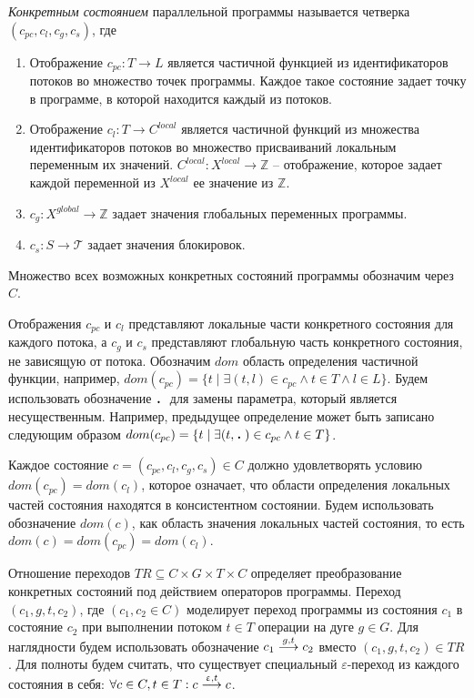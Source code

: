 \emph{Конкретным состоянием} параллельной программы называется четверка $(c_{pc}, c_l, c_g, c_s)$, где
\begin{enumerate}
\item Отображение $c_{pc}: T \to L$ является частичной функцией из идентификаторов потоков во множество точек программы.
Каждое такое состояние задает точку в программе, в которой находится каждый из потоков.
\item Отображение $c_l: T \to C^{local}$ является частичной функций из множества идентификаторов потоков во множество присваиваний локальным переменным их значений. $C^{local}: X^{local} \to \mathbb{Z}$ -- отображение, которое задает каждой переменной из $X^{local}$ ее значение из $\mathbb{Z}$.
\item $c_g: X^{global} \to \mathbb{Z}$ задает значения глобальных переменных программы.
\item $c_s: S \to \mathcal{T}$ задает значения блокировок. 
\end{enumerate}
Множество всех возможных конкретных состояний программы обозначим через $C$.

Отображения $c_{pc}$ и $c_l$ представляют локальные части конкретного состояния для каждого потока, а $c_g$ и $c_s$ представляют глобальную часть конкретного состояния, не зависящую от потока.
Обозначим $dom$ область определения частичной функции, например, $dom(c_{pc})=\{ t \mid \exists (t, l) \in c_{pc} \land t \in T \land l \in L \}$.
Будем использовать обозначение $\qdot$ для замены параметра, который является несущественным.
Например, предыдущее определение может быть записано следующим образом $dom(c_{pc})=\{ t \mid \exists (t, \qdot) \in c_{pc} \land t \in T\}$.

Каждое состояние $c=(c_{pc}, c_l, c_g, c_s)\in C$ должно удовлетворять условию $dom(c_{pc})=dom(c_l)$, которое означает, что области определения локальных частей состояния находятся в консистентном состоянии.
Будем использовать обозначение $dom(c)$, как область значения локальных частей состояния, то есть $dom(c)=dom(c_{pc})=dom(c_l)$.

Отношение переходов $TR \subseteq C \times G \times T \times C$ определяет преобразование конкретных состояний под действием операторов программы. 
Переход  $(c_1, g, t, c_2)$, где $(c_1, c_2 \in C)$ моделирует переход программы из состояния $c_1$ в состояние $c_2$ при выполнении потоком $t \in T$ операции на дуге $g \in G$.
Для наглядности будем использовать обозначение $c_1 \stackrel{g, t}{\longrightarrow} c_2$ вместо $(c_1, g, t, c_2) \in TR$.
Для полноты будем считать, что существует специальный $\varepsilon$-переход из каждого состояния в себя:
$\forall c \in C, t \in T: c \stackrel{\upvarepsilon, t}{\longrightarrow} c$.


